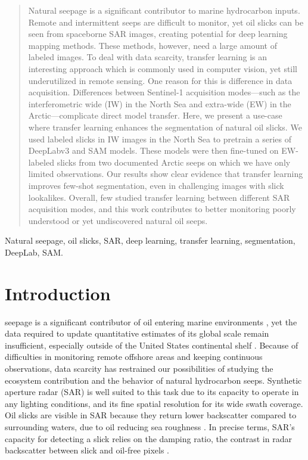 \documentclass[journal]{IEEEtran}
\begin{document}
\begin{abstract}
    Natural seepage is a significant contributor to marine hydrocarbon inputs. Remote and intermittent seeps are difficult to monitor, yet oil slicks can be seen from spaceborne 
    SAR images, creating potential for deep learning mapping methods. These methods, however, need a large amount of labeled images. To deal with data scarcity, transfer learning is an interesting approach 
    which is commonly used in computer vision, yet still underutilized in remote sensing. One reason for this is difference in data acquisition. Differences between Sentinel-1 acquisition modes—such as the 
    interferometric wide (IW) in the North Sea and extra-wide (EW) in the Arctic—complicate direct model transfer. Here, we present a use-case where transfer learning enhances the segmentation 
    of natural oil slicks. We used labeled slicks in IW images in the North Sea to pretrain a series of DeepLabv3 and SAM models. These models were then fine-tuned on EW-labeled slicks from two documented 
    Arctic seeps on which we have only limited observations. Our results show clear evidence that transfer learning improves few-shot segmentation, even in challenging images with slick lookalikes. Overall, 
    few studied transfer learning between different SAR acquisition modes, and this work contributes to better monitoring poorly understood or yet undiscovered natural oil seeps. 
\end{abstract}

\begin{IEEEkeywords}
    Natural seepage, oil slicks, SAR, deep learning, transfer learning, segmentation, DeepLab, SAM.
\end{IEEEkeywords}

\section{Introduction}
 seepage is a significant contributor of oil entering marine environments \cite{kvenvoldenNaturalSeepageCrude2003}, yet the data required to update quantitative
estimates of its global scale remain insufficient, especially outside of the United States continental shelf \cite{nationalacademiesofsciencesengineeringandmedicineOilSeaIV2022}. Because of difficulties 
in monitoring remote offshore areas and keeping continuous observations, data scarcity has restrained our possibilities of studying the ecosystem contribution and the behavior of natural hydrocarbon seeps. 
Synthetic aperture radar (SAR) is well suited to this task due to its capacity to operate in any lighting conditions, and its fine spatial resolution for its wide swath coverage. 
Oil slicks are visible in SAR because they return lower backscatter compared to surrounding waters, due to oil reducing sea roughness \cite{brekkeSAROilSpill2020,fingasReviewOilSpill2018,alpersOilsSurfactants2004}.
In precise terms, SAR's capacity for detecting a slick relies on the damping ratio, the contrast in radar backscatter between slick and oil-free pixels \cite{hovlandSlickDetectionSAR1994,
quigleyInvestigationDampingRatio2023}.
\end{document}
